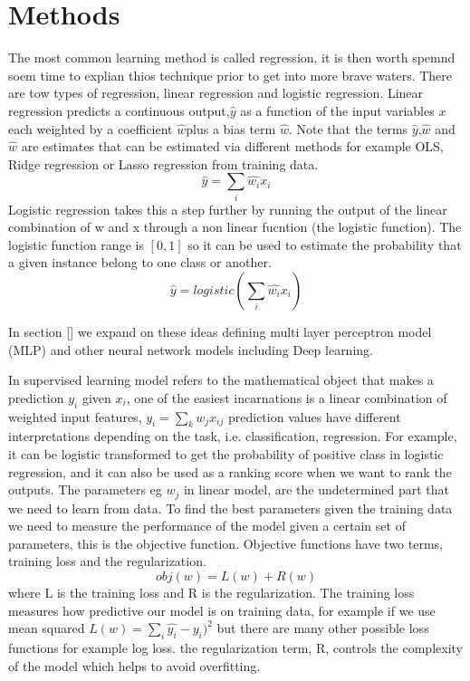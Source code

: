 \documentclass[12pt]{report}
\begin{document}
\section{Methods}
\label{se:me}
The most common learning method is called regression, it is then worth spemnd soem time to explian thios technique prior to get into more brave waters. There are tow types of regression, linear regression and logistic regression.
Linear regression predicts a continuous output,$\hat{y}$ as a function of the input variables $x$ each weighted by a coefficient $\hat{w}$plus a bias term $\hat{w}$. Note that the terms $\hat{y}$,$\hat{w}$ and $\hat{w}$ are estimates that can be estimated via different methods for example OLS, Ridge regression or Lasso regression from training data.
\begin{equation}
\hat{y} = \sum_i \hat{w_i}x_i
\end{equation}
Logistic regression takes this a step further by running the output  of the linear combination of w and x through a non linear fucntion (the logistic function). The logistic function range is $[0,1]$ so it can be used to estimate the probability that a given instance belong to one class or another.
\begin{equation}
\hat{y} = logistic(\sum_i \hat{w_i}x_i)
\end{equation}

In section \ref{} we expand on these ideas defining multi layer perceptron model (MLP) and other neural network models including Deep learning.


\cite{patania2017topological}
In supervised learning model refers to the mathematical object that makes a prediction $y_i$ given $x_i$, one of the easiest incarnations is a linear combination of weighted input features, $y_i = \sum_k w_j x_{ij}$ prediction values have different interpretations depending on the task, i.e. classification, regression. For example, it can be logistic transformed to get the probability of positive class in logistic regression, and it can also be used as a ranking score when we want to rank the outputs.
The parameters eg $w_j$ in linear model, are the undetermined part that we need to learn from data. To find the best parameters given the training data we need to measure the performance of the model given a certain set of parameters, this is the objective function. Objective functions have two terms, training loss and the regularization.
\begin{equation}
obj(w) = L(w) + R(w)
\end{equation}
where L is the training loss and R is the regularization. The training loss measures how predictive our model is on training data, for example if we use mean squared $L(w) = \sum_i \hat{y_i} - y_i)^2$ but there are many other possible loss functions for example log loss.
the regularization term, R, controls the complexity of the model which helps to avoid overfitting.
\end{document}
